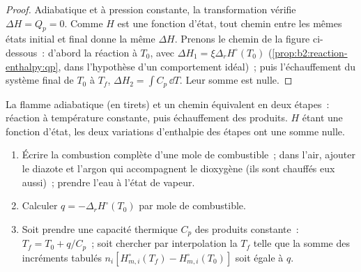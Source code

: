 \begin{proof}
Adiabatique et à pression constante, la transformation vérifie $\Delta H =
Q_p = 0$. Comme $H$ est une fonction d'état, tout chemin entre les mêmes états initial et
final donne la même $\Delta H$. Prenons le chemin de
la figure ci-dessous~: d'abord la réaction à $T_0$, avec
$\Delta H_1 = \xi\Delta_r H^\circ(T_0)$ (\cref{prop:b2:reaction-enthalpy:qp},
dans l'hypothèse d'un comportement idéal)~; puis l'échauffement du système final de $T_0$ à
$T_f$, $\Delta H_2 = \int C_p\,\dd T$. Leur somme est nulle.
\end{proof}

\begin{omfigure}

{\small La flamme adiabatique (en tirets) et un chemin équivalent en deux
étapes~: réaction à température constante, puis échauffement des produits.
$H$ étant une fonction d'état, les deux variations d'enthalpie des étapes ont
une somme nulle.}
\end{omfigure}

\begin{method}\label{met:b2:reaction-enthalpy:flame-temperature}
\begin{enumerate}
  \item Écrire la combustion complète d'une mole de combustible~; dans l'air, ajouter
        le diazote et l'argon qui accompagnent le dioxygène (ils sont chauffés
        eux aussi)~; prendre l'eau à l'état de vapeur.
  \item Calculer $q = -\Delta_r H^\circ(T_0)$ par mole de combustible.
  \item Soit prendre une capacité thermique $C_p$ des produits constante~:
        $T_f = T_0 + q/C_p$~; soit chercher par interpolation la $T_f$ telle que la somme des
        incréments tabulés $n_i[H^\circ_{m,i}(T_f) - H^\circ_{m,i}(T_0)]$
        soit égale à $q$.
\end{enumerate}
\end{method}

